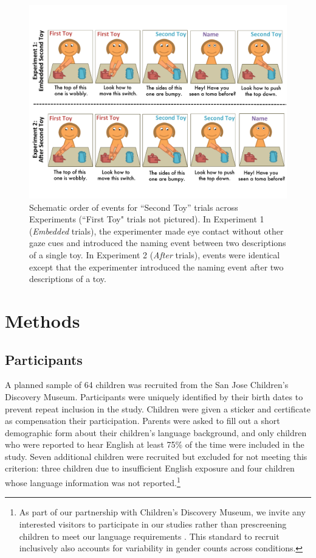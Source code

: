 \documentclass[man]{apa2}
\begin{document}
\begin{figure} 
  \begin{center} 
    \includegraphics[width=6in]{figures/continuity_demo_slide.pdf} 
    \caption{\label{fig:demo} Schematic order of events for ``Second Toy'' trials across Experiments (``First Toy" trials not pictured). In Experiment 1 (\emph{Embedded} trials), the experimenter made eye contact without other gaze cues and introduced the naming event between two descriptions of a single toy.  In Experiment 2 (\emph{After} trials), events were identical except that the experimenter introduced the naming event after two descriptions of a toy.} 
  \end{center} 
\end{figure}	

\section{Methods}


\subsection{Participants}

A planned sample of 64 children was recruited from the San Jose Children's Discovery Museum.  Participants were uniquely identified by their birth dates to prevent repeat inclusion in the study.  Children were given a sticker and certificate as compensation their participation.  Parents were asked to fill out a short demographic form about their children's language background, and only children who were reported to hear English at least 75\% of the time were included in the study.  Seven additional children were recruited but excluded for not meeting this criterion: three children due to insufficient English exposure and four children whose language information was not reported.\footnote{As part of our partnership with Children's Discovery Museum, we invite any interested visitors to participate in our studies rather than prescreening children to meet our language requirements \cite{callanan2012}. This standard to recruit inclusively also accounts for variability in gender counts across conditions.}
\end{document}

